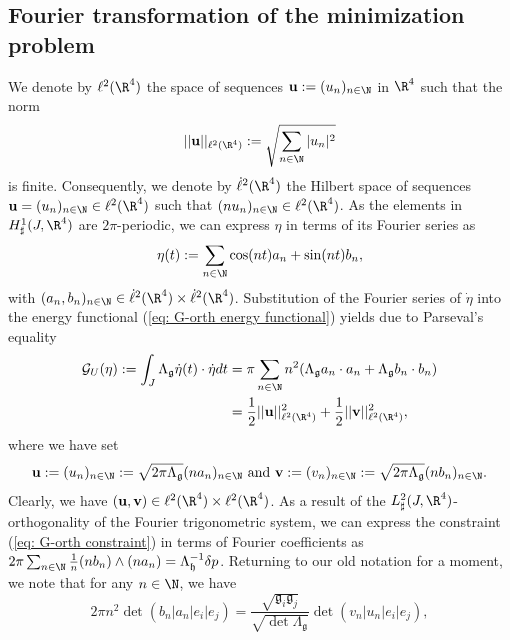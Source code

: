 \subsection{Fourier transformation of the minimization problem}
We denote by $\ell^2(\R^4)$ the space of sequences $\mathbf{u} := (u_n)_{n \in \N}$ in $\R^4$ such that the norm
\begin{equation}
	||\mathbf{u}||_{\ell^2(\R^4)} := \sqrt{ \sum_{n \in \N} |u_n|^2 }
\end{equation}
is finite. Consequently, we denote by $\dot{\ell}^2(\R^4)$ the Hilbert space of sequences $\mathbf{u} = (u_n)_{n \in \N} \in \ell^2(\R^4)$ such that $(n u_n)_{n \in \N} \in \ell^2(\R^4)$. As the elements in $H_{\sharp}^{1}(J, \R^4)$ are $2\pi$-periodic, we can express $\eta$ in terms of its Fourier series as
\begin{equation}
\eta(t) := \sum_{n \in \N} \cos(nt) a_n + \sin(n t) b_n,
\end{equation}
with $(a_n, b_n)_{n \in \N} \in \dot{\ell}^2(\R^4) \times \dot{\ell}^2(\R^4)$. Substitution of the Fourier series of $\dot{\eta}$ into the energy functional (\ref{eq: G-orth energy functional}) yields due to Parseval's equality
\begin{align}
\mathcal{G}_{U} (\eta) := \int_{J} \Lambda_{\mathfrak{g}} \dot{\eta}(t) \cdot \dot{\eta} dt &= \pi \sum_{n  \in \N} n^2(\Lambda_{\mathfrak{g}} a_n \cdot a_n + \Lambda_{\mathfrak{g}} b_n \cdot b_n) \\  &=
\frac{1}{2} ||\mathbf{u}||_{\ell^2(\R^4)}^2 + \frac{1}{2} ||\mathbf{v}||_{\ell^2(\R^4)}^2,
\end{align}
where we have set
\begin{align}
\label{eq:relation Fourier coeffs of eta}
	\mathbf{u} := (u_n)_{n \in \N} := \sqrt{2 \pi \Lambda_{\mathfrak{g}}}(n a_n)_{n \in \N} \text{ and } \mathbf{v} := (v_n)_{n \in \N} := \sqrt{2 \pi \Lambda_{\mathfrak{g}}} (n b_n)_{n \in \N}.
\end{align}
Clearly, we have $(\mathbf{u}, \mathbf{v}) \in \ell^2(\R^4) \times \ell^2(\R^4)$. As a result of the $L_{\sharp}^2(J, \R^4)$-orthogonality of the Fourier trigonometric system, we can express the constraint (\ref{eq: G-orth constraint}) in terms of Fourier coefficients as $2 \pi \sum_{n \in \N} \tfrac{1}{n} (nb_n) \wedge (n a_n) = \Lambda_{\mathfrak{h}}^{-1} \delta p$. Returning to our old notation for a moment, we note that for any $n \in \N$, we have
\begin{equation}
2 \pi n^2 \det(b_n | a_n | e_i | e_j) = \frac{\sqrt{\mathfrak{g}_i \mathfrak{g}_j}}{\sqrt{\det \Lambda_{\mathfrak{g}}}} \det(v_n | u_n |e_i | e_j),
\end{equation}
